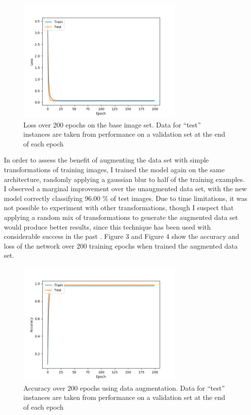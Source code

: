 \documentclass[letterpaper,twocolumn,10pt]{article}
\begin{document}
\begin{figure}
\includegraphics[width=3.25in]{loss}
\caption{Loss over 200 epochs on the base image set. Data for ``test'' instances are taken from performance on a validation set at the end of each epoch}
\end{figure}

In order to assess the benefit of augmenting the data set with simple transformations of training images, I trained the model again on the same architecture, randomly applying a gaussian blur to half of the training examples. I observed a marginal improvement over the unaugmented data set, with the new model correctly classifying 96.00 \% of test images. Due to time limitations, it was not possible to experiment with other transformations, though I suspect that applying a random mix of transformations to generate the augmented data set would produce better results, since this technique has been used with considerable success in the past \cite{ciresan_committee_2011}. Figure 3 and Figure 4 show the accuracy and loss of the network over 200 training epochs when trained the augmented data set.

\begin{figure}
\includegraphics[width=3.25in]{accuracy}
\caption{Accuracy over 200 epochs using data augmentation. Data for ``test'' instances are taken from performance on a validation set at the end of each epoch}
\end{figure}
\end{document}

